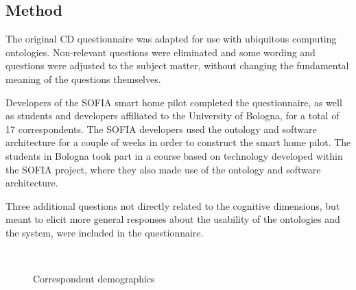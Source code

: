 \subsection{Method}

The original \ac{CD} questionnaire \cite{Blackwell2007} was adapted for use with ubiquitous computing ontologies. Non-relevant questions were eliminated and some wording and questions were adjusted to the subject matter, without changing the fundamental meaning of the questions themselves. 

Developers of the \ac{SOFIA} smart home pilot completed the questionnaire, as well as students and developers affiliated to the University of Bologna, for a total of 17 correspondents. The \ac{SOFIA} developers used the ontology and software architecture for a couple of weeks in order to construct the smart home pilot. The students in Bologna took part in a course based on technology developed within the \ac{SOFIA} project, where they also made use of the ontology and software architecture. 

Three additional questions not directly related to the cognitive dimensions, but meant to elicit more general responses about the usability of the ontologies and the system, were included in the questionnaire.

\begin{figure}[bth] 
         \quad
         \\
         \quad
        
        \caption{Correspondent demographics}\label{demographics}
\end{figure}

% 
% 
% 

